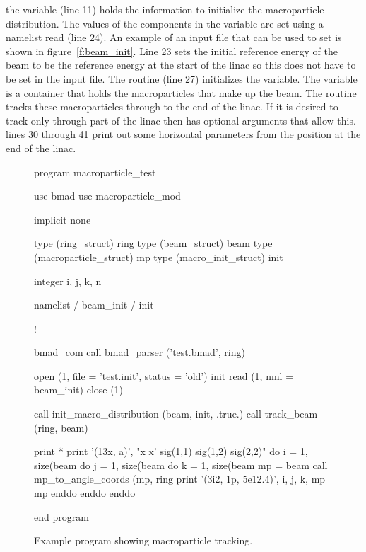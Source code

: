 {{{{{{{{{{the  variable (line 11) holds the information to initialize
the macroparticle distribution. The values of the components in the
 variable are set using a namelist read (line 24). An example
of an input file that can be used to set  is shown in
figure~\ref{f:beam_init}. Line 23 sets the initial reference energy of
the beam to be the reference energy at the start of the linac so this
does not have to be set in the input file.  The
 routine (line 27) initializes the
 variable. The  variable is a container that holds
the macroparticles that make up the beam. The  routine
tracks these macroparticles through to the end of the linac. If it is
desired to track only through part of the linac then 
has optional arguments that allow this. lines 30 through 41 print out
some horizontal parameters from the position at the end of the linac.


\begin{figure}
\begin{listing}{1}
program macroparticle_test

  use bmad
  use macroparticle_mod

  implicit none

  type (ring_struct) ring
  type (beam_struct) beam
  type (macroparticle_struct) mp
  type (macro_init_struct) init

  integer i, j, k, n

  namelist / beam_init / init

!

  bmad_com%
  call bmad_parser ('test.bmad', ring)

  open (1, file = 'test.init', status = 'old')
  init%
  read (1, nml = beam_init)
  close (1)

  call init_macro_distribution (beam, init, .true.)
  call track_beam (ring, beam)

  print *
  print '(13x, a)', "x          x'    sig(1,1)    sig(1,2)    sig(2,2)"
  do i = 1, size(beam%
    do j = 1, size(beam%
      do k = 1, size(beam%
        mp = beam%
        call mp_to_angle_coords (mp, ring%
        print '(3i2, 1p, 5e12.4)', i, j, k, mp%
                  mp%
      enddo
    enddo
  enddo

end program
\end{listing}
\caption{Example program showing macroparticle tracking.}
\label{f:macro_program}
\end{figure}

}}}}}}}}}}
